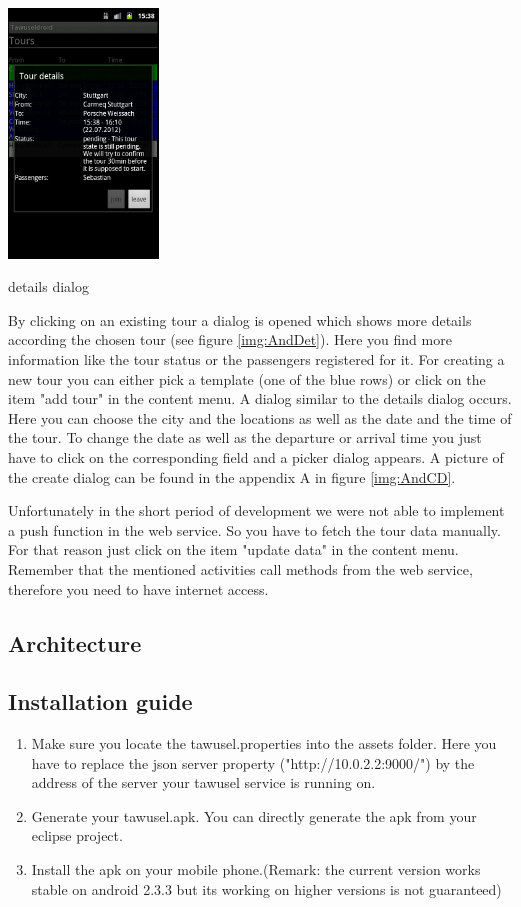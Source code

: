 \emptyRow
\begin{floatingfigure}[l]{5cm}
	\includegraphics[width=4cm]{images/Tawuseldroid_details.png}
	\caption{details dialog}
	\label{img:AndDet}
\end{floatingfigure}
\noindent
By clicking on an existing tour a dialog is opened which shows more details according the chosen tour (see figure \ref{img:AndDet}). Here you find more information like the tour status or the passengers registered for it. For creating a new tour you can either pick a template (one of the blue rows) or click on the item "add tour" in the content menu. A dialog similar to the details dialog occurs. Here you can choose the city and the locations as well as the date and the time of the tour. To change the date as well as the departure or arrival time you just have to click on the corresponding field and a picker dialog appears.  A picture of the create dialog can be found in the appendix A in figure \ref{img:AndCD}.

\emptyRow
Unfortunately in the short period of development we were not able to implement a push function in the web service. So you have to fetch the tour data manually. For that reason just click on the item "update data" in the content menu. Remember that the mentioned activities call methods from the web service, therefore you need to have internet access.

\clearpage
\subsection{Architecture}\label{ssec:AndrArc}



\subsection{Installation guide}\label{ssec:AndrInst}

\begin{enumerate}
	\item Make sure you locate the tawusel.properties into the assets folder. Here you have to replace the json server property ("http://10.0.2.2:9000/") by the address of the server your tawusel service is running on.
	\item Generate your tawusel.apk. You can directly generate the apk from your eclipse project.
	\item Install the apk on your mobile phone.(Remark: the current version works stable on android 2.3.3 but its working on higher versions is not guaranteed)
\end{enumerate}
